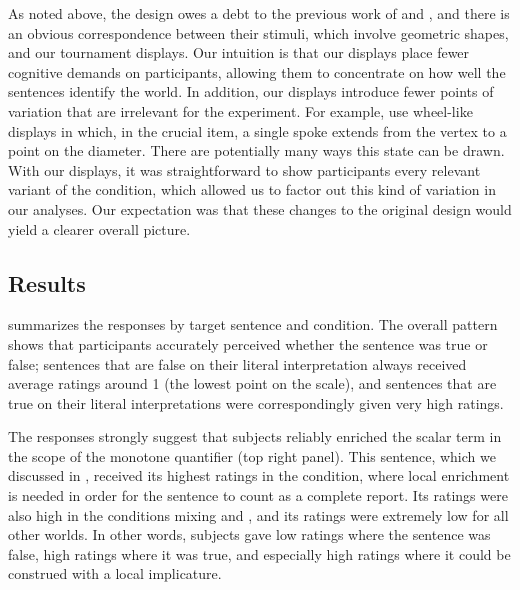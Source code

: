 \documentclass[leqno]{article}
\begin{document}
As noted above, the design owes a debt to the previous work of
\citet{Geurts:Pouscoulous:2009} and \citet{Chemla:Spector:2011}, and
there is an obvious correspondence between their stimuli, which
involve geometric shapes, and our tournament displays. Our intuition
is that our displays place fewer cognitive demands on participants,
allowing them to concentrate on how well the sentences identify the
world. In addition, our displays introduce fewer points of variation
that are irrelevant for the experiment. For example,
\citet{Chemla:Spector:2011} use wheel-like displays in which, in the
crucial item, a single spoke extends from the vertex to a point on the
diameter. There are potentially many ways this state can be
drawn. With our displays, it was straightforward to show participants
every relevant variant of the condition, which allowed us to
factor out this kind of variation in our analyses. Our
expectation was that these changes to the original design would yield
a clearer overall picture.


\subsection{Results}\label{sec:exp1:results}

 summarizes the responses by target sentence
and condition. The overall pattern shows that participants accurately
perceived whether the sentence was true or false; sentences that are
false on their literal interpretation always received average ratings
around 1 (the lowest point on the scale), and sentences that are true
on their literal interpretations were correspondingly given very high
ratings.

The responses strongly suggest that subjects reliably enriched the
scalar term in the scope of the monotone quantifier  (top right panel). This sentence, which we discussed in
, received its highest ratings in the
 condition, where local enrichment is needed in order for
the sentence to count as a complete report. Its ratings were also high
in the conditions mixing  and , and its ratings were
extremely low for all other worlds. In other words, subjects gave low
ratings where the sentence was false, high ratings where it was true,
and especially high ratings where it could be construed with a local
implicature.
\end{document}
